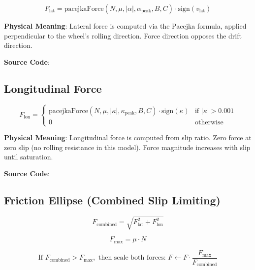 \begin{equation}
  F_{\text{lat}} = \text{pacejkaForce}(N, \mu, |\alpha|, \alpha_{\text{peak}}, B, C) \cdot \text{sign}(v_{\text{lat}})
  \label{eq:lateral-force}
\end{equation}

\textbf{Physical Meaning}: Lateral force is computed via the Pacejka formula, applied perpendicular to the wheel's rolling direction. Force direction opposes the drift direction.

\textbf{Source Code}: 

\subsection{Longitudinal Force}

\begin{equation}
  F_{\text{lon}} = \begin{cases}
    \text{pacejkaForce}(N, \mu, |\kappa|, \kappa_{\text{peak}}, B, C) \cdot \text{sign}(\kappa) & \text{if } |\kappa| > 0.001 \\
    0 & \text{otherwise}
  \end{cases}
  \label{eq:longitudinal-force}
\end{equation}

\textbf{Physical Meaning}: Longitudinal force is computed from slip ratio. Zero force at zero slip (no rolling resistance in this model). Force magnitude increases with slip until saturation.

\textbf{Source Code}: 

\subsection{Friction Ellipse (Combined Slip Limiting)}

\begin{equation}
  F_{\text{combined}} = \sqrt{F_{\text{lat}}^2 + F_{\text{lon}}^2}
  \label{eq:friction-combined}
\end{equation}

\begin{equation}
  F_{\text{max}} = \mu \cdot N
  \label{eq:friction-max}
\end{equation}

\begin{equation}
  \text{If } F_{\text{combined}} > F_{\text{max}}, \text{ then scale both forces: } F \leftarrow F \cdot \frac{F_{\text{max}}}{F_{\text{combined}}}
  \label{eq:friction-ellipse}
\end{equation}

